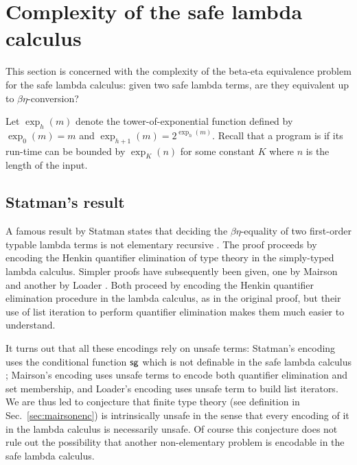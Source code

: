 \newcommand\bigo{\mathcal{O}} %
\newcommand\booltype{\mathsf{B}}
\newcommand\towerexp[2]{\exp_{#1}(#2)}

\section{Complexity of the safe lambda calculus}
This section is concerned with the complexity of the
beta-eta equivalence problem for the safe lambda calculus:
given two safe lambda terms, are they equivalent up to $\beta\eta$-conversion?



Let $\towerexp{h}{m}$ denote the tower-of-exponential function
defined by $\towerexp{0}{m} = m$ and $\towerexp{h+1}{m} =
2^{\towerexp{h}{m}}$. Recall that a program is
 if its run-time can be bounded by
$\towerexp{K}{n}$ for some constant $K$ where $n$ is the length of
the input.

\subsection{Statman's result}

A famous result by Statman  states that deciding the
$\beta\eta$-equality of two first-order typable lambda terms is not
elementary recursive \cite{Statman:1979:TLE}. The proof proceeds by
encoding the Henkin quantifier elimination of type theory in the
simply-typed lambda calculus. Simpler proofs have subsequently been
given, one by Mairson \cite{mairson1992spt} and another by Loader
\cite{Loader1998}. Both proceed by encoding the Henkin quantifier
elimination procedure in the lambda calculus, as in the original
proof, but their use of list iteration to perform quantifier
elimination makes them much easier to understand.

It turns out that all these encodings rely on unsafe terms:
Statman's encoding uses the conditional function $\sf sg$ which is
not definable in the safe lambda calculus
\cite{blumong:safelambdacalculus}; Mairson's encoding uses unsafe
terms to encode both quantifier elimination and set membership, and
Loader's encoding uses unsafe term to build list iterators. We are
thus led to conjecture that finite type theory (see definition in
Sec.\ \ref{sec:mairsonenc}) is intrinsically unsafe in the sense
that every encoding of it in the lambda calculus is necessarily
unsafe. Of course this conjecture does not rule out the possibility
that another non-elementary problem is encodable in the safe lambda
calculus.

